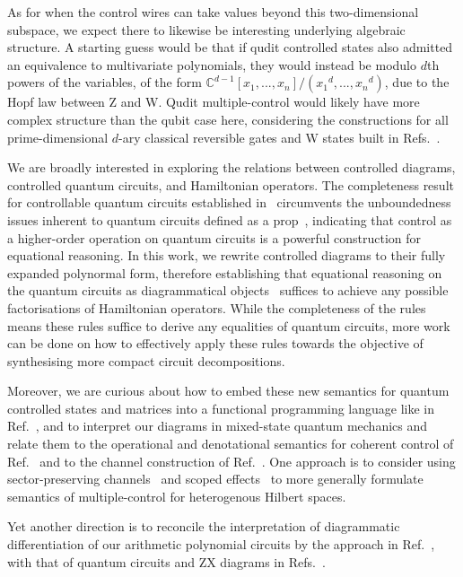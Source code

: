 As for when the control wires can take values beyond this two-dimensional subspace, we expect there to likewise be interesting underlying algebraic structure.
A starting guess would be that if qudit controlled states also admitted an equivalence to multivariate polynomials, they would instead be modulo $d$th powers of the variables, of the form $\mathbb{C}^{d-1}[x_1,...,x_n]/({x_1}^d,...,{x_n}^d)$, due to the Hopf law between Z and W.
Qudit multiple-control would likely have more complex structure than the qubit case here, considering the constructions for all prime-dimensional $d$-ary classical reversible gates and W states built in Refs.~\cite{Yeh2022QutritCtrl, Roy2023quditzh, Yeh2023quditW}.

We are broadly interested in exploring the relations between controlled diagrams, controlled quantum circuits, and Hamiltonian operators.
The completeness result for controllable quantum circuits established in~\cite{delorme2026ctrl} circumvents the unboundedness issues inherent to quantum circuits defined as a prop~\cite{clement2024minqc}, indicating that control as a higher-order operation on quantum circuits is a powerful construction for equational reasoning. In this work, we rewrite controlled diagrams to their fully expanded polynormal form, therefore establishing that equational reasoning on the quantum circuits as diagrammatical objects~\cite{shaikh2022sum} suffices to achieve any possible factorisations of Hamiltonian operators.
While the completeness of the rules means these rules suffice to derive any equalities of quantum circuits, more work can be done on how to effectively apply these rules towards the objective of synthesising more compact circuit decompositions.

Moreover, we are curious about how to embed these new semantics for quantum controlled states and matrices into a functional programming language like in Ref.~\cite{rennela2020clctrllinlogic}, and to interpret our diagrams in mixed-state quantum mechanics and relate them to the operational and denotational semantics for coherent control of Ref.~\cite{barsse2025qplcoherent} and to the channel construction of Ref.~\cite{deFelice2026dataflow}.
One approach is to consider using sector-preserving channels~\cite{Vanrietvelde2021ctrlsector} and scoped effects~\cite{lindley2024scoped} to more generally formulate semantics of multiple-control for heterogenous Hilbert spaces.

Yet another direction is to reconcile the interpretation of diagrammatic differentiation of our arithmetic polynomial circuits by the approach in Ref.~\cite{wilson2023diffpolycirc}, with that of quantum circuits and ZX diagrams in Refs.~\cite{toumi2021diagdiff, Wang2024diffintzx, jeandel2024adddiffzx}.